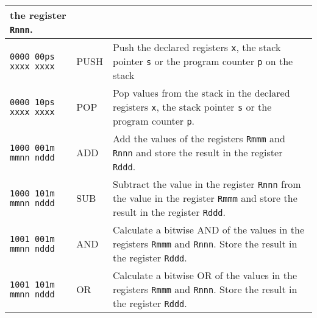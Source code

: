 \documentclass[twoside]{article}
\begin{document}
\begin{table}[H]
\begin{longtable}{m{}m{}m{}}
                                                    the register \texttt{Rnnn}.\\
                                                    \hline
                                                    \bigstrut
        \texttt{0000 00ps xxxx xxxx} & PUSH      & Push the declared registers \texttt{x}, the stack pointer \texttt{s} or the program counter \texttt{p} on the stack\\
        \hline
        \texttt{0000 10ps xxxx xxxx} & POP       & Pop values from the stack in the declared registers \texttt{x}, the stack pointer \texttt{s} or the program counter \texttt{p}.\\
        \hline
        \texttt{1000 001m mmnn nddd} & ADD       & Add the values of the registers
                                                    \texttt{Rmmm} and \texttt{Rnnn} and
                                                    store the result in the register
                                                    \texttt{Rddd}.\\
                                                    \hline
                                                    \bigstrut
        \texttt{1000 101m mmnn nddd} & SUB       & Subtract the value in the register
                                                    \texttt{Rnnn} from the value in
                                                    the register \texttt{Rmmm} and store
                                                    the result in the register
                                                    \texttt{Rddd}.\\
                                                    \hline
                                                    \bigstrut
        \texttt{1001 001m mmnn nddd} & AND       & Calculate a bitwise AND of the values in
                                                    the registers \texttt{Rmmm}
                                                    and \texttt{Rnnn}. Store the result
                                                    in the register \texttt{Rddd}.\\
                                                    \hline
                                                    \bigstrut
        \texttt{1001 101m mmnn nddd} & OR        & Calculate a bitwise OR of the values
                                                    in the registers \texttt{Rmmm} and
                                                    \texttt{Rnnn}. Store the result in
                                                    the register \texttt{Rddd}.\\

\end{longtable}
\end{table}
\end{document}
